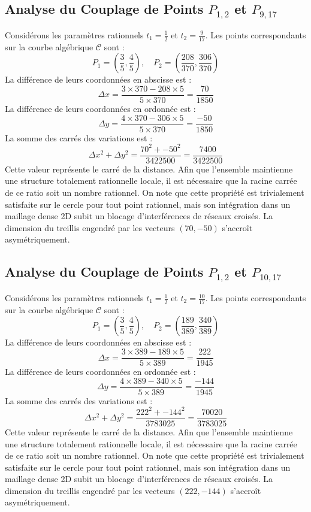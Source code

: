 \documentclass[12pt, a4paper]{article}
\begin{document}
\subsection{Analyse du Couplage de Points $P_{1,2}$ et $P_{9,17}$}
Considérons les paramètres rationnels $t_1 = \frac{1}{2}$ et $t_2 = \frac{9}{17}$.
Les points correspondants sur la courbe algébrique $\mathcal{C}$ sont :
$$ P_1 = \left( \frac{3}{5}, \frac{4}{5} \right), \quad P_2 = \left( \frac{208}{370}, \frac{306}{370} \right) $$
La différence de leurs coordonnées en abscisse est :
$$ \Delta x = \frac{3 \times 370 - 208 \times 5}{5 \times 370} = \frac{70}{1850} $$
La différence de leurs coordonnées en ordonnée est :
$$ \Delta y = \frac{4 \times 370 - 306 \times 5}{5 \times 370} = \frac{-50}{1850} $$
La somme des carrés des variations est :
$$ \Delta x^2 + \Delta y^2 = \frac{ 70^2 + -50^2 }{ 3422500 } = \frac{ 7400 }{ 3422500 } $$
Cette valeur représente le carré de la distance. Afin que l'ensemble maintienne une structure totalement rationnelle locale, il est nécessaire que la racine carrée de ce ratio soit un nombre rationnel. On note que cette propriété est trivialement satisfaite sur le cercle pour tout point rationnel, mais son intégration dans un maillage dense 2D subit un blocage d'interférences de réseaux croisés. La dimension du treillis engendré par les vecteurs $( 70, -50 )$ s'accroît asymétriquement.


\subsection{Analyse du Couplage de Points $P_{1,2}$ et $P_{10,17}$}
Considérons les paramètres rationnels $t_1 = \frac{1}{2}$ et $t_2 = \frac{10}{17}$.
Les points correspondants sur la courbe algébrique $\mathcal{C}$ sont :
$$ P_1 = \left( \frac{3}{5}, \frac{4}{5} \right), \quad P_2 = \left( \frac{189}{389}, \frac{340}{389} \right) $$
La différence de leurs coordonnées en abscisse est :
$$ \Delta x = \frac{3 \times 389 - 189 \times 5}{5 \times 389} = \frac{222}{1945} $$
La différence de leurs coordonnées en ordonnée est :
$$ \Delta y = \frac{4 \times 389 - 340 \times 5}{5 \times 389} = \frac{-144}{1945} $$
La somme des carrés des variations est :
$$ \Delta x^2 + \Delta y^2 = \frac{ 222^2 + -144^2 }{ 3783025 } = \frac{ 70020 }{ 3783025 } $$
Cette valeur représente le carré de la distance. Afin que l'ensemble maintienne une structure totalement rationnelle locale, il est nécessaire que la racine carrée de ce ratio soit un nombre rationnel. On note que cette propriété est trivialement satisfaite sur le cercle pour tout point rationnel, mais son intégration dans un maillage dense 2D subit un blocage d'interférences de réseaux croisés. La dimension du treillis engendré par les vecteurs $( 222, -144 )$ s'accroît asymétriquement.
\end{document}
